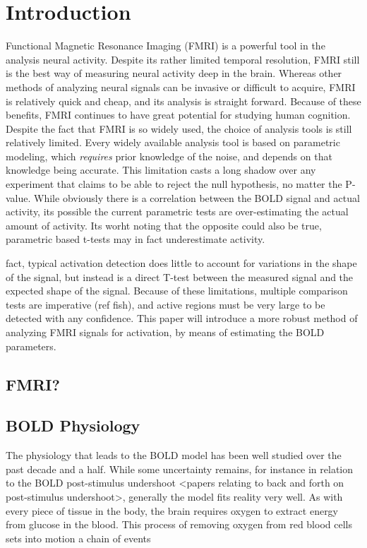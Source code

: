 \documentclass{article}
\begin{document}
\section*{Introduction}
Functional Magnetic Resonance Imaging (FMRI) is a powerful tool in the analysis
neural activity. Despite its rather limited temporal resolution, FMRI still
is the best way of measuring neural activity deep in the brain. 
Whereas other methods
of analyzing neural signals can be invasive or difficult to acquire, 
FMRI is relatively quick and cheap, and its analysis is straight forward.
Because of these benefits, FMRI continues to have great potential for
studying human cognition. Despite the fact that FMRI is so widely used,
the choice of analysis tools is still relatively limited. Every widely
available analysis tool is based on parametric modeling, which \emph{requires}
prior knowledge of the noise, and depends on that knowledge being accurate.
This limitation casts a long shadow over any experiment that claims to be
able to reject the null hypothesis, no matter the P-value. While obviously
there is a correlation between the BOLD signal and actual activity, its
possible the current parametric tests are over-estimating the actual amount
of activity. Its worht noting that the opposite could also be true, parametric
based t-tests may in fact underestimate activity. 

fact, typical activation detection does little to account for variations
in the shape of the signal, but instead is a direct T-test between the measured signal
and the expected shape of the signal. Because of these limitations,
multiple comparison tests are imperative (ref fish), and active regions
must be very large to be detected with any confidence. This paper
will introduce a more robust method of analyzing FMRI signals for 
activation, by means of estimating the BOLD parameters.

\subsection*{FMRI?}

\subsection*{BOLD Physiology}
The physiology that leads to the BOLD model has been well studied over the 
past decade and a half. While some uncertainty remains, for instance in
relation to the BOLD post-stimulus undershoot <papers relating to back and
forth on post-stimulus undershoot>, generally the model fits reality very 
well. As with every piece of tissue in the body, the brain requires oxygen
to extract energy from glucose in the blood. This process of removing oxygen
from red blood cells sets into motion a chain of events
\end{document}
